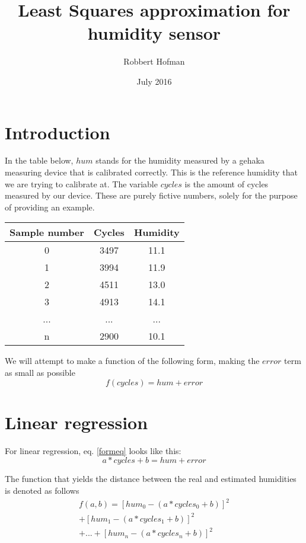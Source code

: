 \documentclass{article}
\title{Least Squares approximation for humidity sensor}
\author{Robbert Hofman}
\date{July 2016}
\begin{document}
\maketitle

\section{Introduction}
In the table below, $hum$ stands for the humidity measured by a gehaka measuring device that is calibrated correctly. 
This is the reference humidity that we are trying to calibrate at. 
The variable $cycles$ is the amount of cycles measured by our device.
These are purely fictive numbers, solely for the purpose of providing an example.

\begin{center}
\begin{tabular}{ c c c }
\hline
 Sample number & Cycles & Humidity \\ 
\hline
 0 & 3497 & 11.1  \\  
 1 & 3994 & 11.9 \\
 2 & 4511 & 13.0 \\
 3 & 4913 & 14.1 \\ 
 ... & ... & ... \\ 
 n & 2900 & 10.1
\end{tabular}
\end{center}

We will attempt to make a function of the following form, making the $error$ term as small as possible
\begin{equation}
\label{formeq}
f(cycles) = hum + error
\end{equation}

\section{Linear regression}
For linear regression, eq. \ref{formeq} looks like this:
\begin{equation}
\label{formlin}
a*cycles + b = hum + error
\end{equation}

The function that yields the distance between the real and estimated humidities is denoted as follows
\begin{equation}
	\begin{split}
		f(a,b) = [hum_{0} - (a*cycles_{0} + b)]^{2} \\
		+ [hum_{1} - (a*cycles_{1} + b)]^{2} \\
	 + ... +  [hum_{n} - (a*cycles_{n} + b)]^{2}
	\end{split}
\end{equation}
\end{document}
